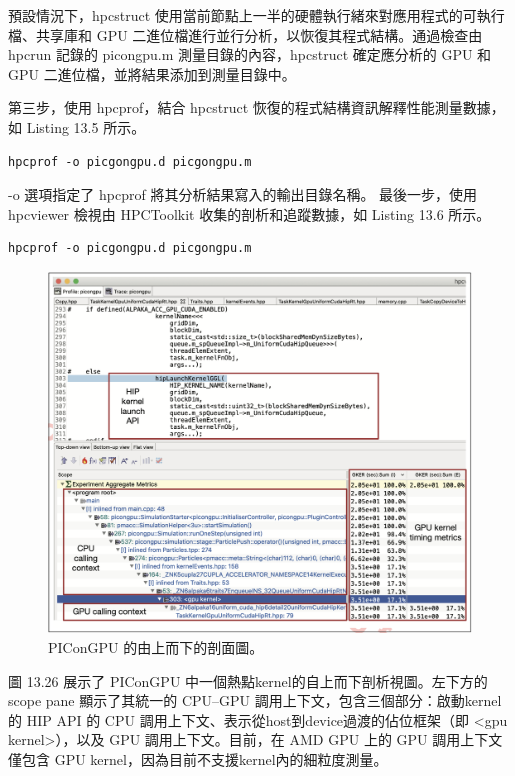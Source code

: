 預設情況下，hpcstruct 使用當前節點上一半的硬體執行緒來對應用程式的可執行檔、共享庫和 GPU 二進位檔進行並行分析，以恢復其程式結構。通過檢查由 hpcrun 記錄的 picongpu.m 測量目錄的內容，hpcstruct 確定應分析的 GPU 和 GPU 二進位檔，並將結果添加到測量目錄中。

第三步，使用 hpcprof，結合 hpcstruct 恢復的程式結構資訊解釋性能測量數據，如 Listing 13.5 所示。

\begin{lstlisting}[caption={Listing 13.5: Example of the hpcprof command.}]
hpcprof -o picgongpu.d picgongpu.m
\end{lstlisting}

-o 選項指定了 hpcprof 將其分析結果寫入的輸出目錄名稱。
最後一步，使用 hpcviewer 檢視由 HPCToolkit 收集的剖析和追蹤數據，如 Listing 13.6 所示。

\begin{lstlisting}[caption={Listing 13.6: Example of the hpcviewer command.}]
hpcprof -o picgongpu.d picgongpu.m
\end{lstlisting}

\begin{figure}
    \centering
    \includegraphics[width=0.9\linewidth]{FileAusiliari/Screenshots/Figure13-26.png}
    \caption{PIConGPU 的由上而下的剖面圖。}
    \label{fig:PAPI26}
\end{figure}

圖 13.26 展示了 PIConGPU 中一個熱點kernel的自上而下剖析視圖。左下方的 scope pane 顯示了其統一的 CPU–GPU 調用上下文，包含三個部分：啟動kernel的 HIP API 的 CPU 調用上下文、表示從host到device過渡的佔位框架（即 <gpu kernel>），以及 GPU 調用上下文。目前，在 AMD GPU 上的 GPU 調用上下文僅包含 GPU kernel，因為目前不支援kernel內的細粒度測量。

